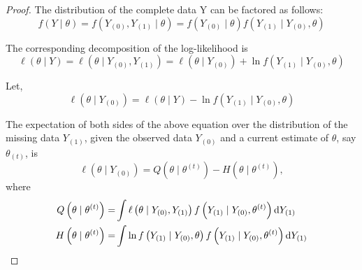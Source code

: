\begin{proof}
	The distribution of the complete data Y can be factored as follows:
	\begin{equation}
		f(Y \mid \theta)=f\left(Y_{(0)}, Y_{(1)} \mid \theta\right)=f\left(Y_{(0)} \mid \theta\right) f\left(Y_{(1)} \mid Y_{(0)}, \theta\right)
	\end{equation}

	The corresponding decomposition of the log-likelihood is
	\begin{equation}
		\ell(\theta \mid Y)=\ell\left(\theta \mid Y_{(0)}, Y_{(1)}\right)=\ell\left(\theta \mid Y_{(0)}\right)+\ln f\left(Y_{(1)} \mid Y_{(0)}, \theta\right)
	\end{equation}

	Let,
	\begin{equation}
		\ell\left(\theta \mid Y_{(0)}\right)=\ell(\theta \mid Y)-\ln f\left(Y_{(1)} \mid Y_{(0)}, \theta\right)
	\end{equation}

	The expectation of both sides of the above equation over the distribution of the missing data $Y_{(1)}$, given the observed data $Y_{(0)}$ and a current estimate of $\theta$, say $\theta_{(t)}$, is
	\begin{equation}
		\ell\left(\theta \mid Y_{(0)}\right)=Q\left(\theta \mid \theta^{(t)}\right)-H\left(\theta \mid \theta^{(t)}\right),
	\end{equation}
	where
	\begin{equation}
		\begin{aligned}
			Q\left(\theta \mid \theta^{(t)}\right)= & \int\ell\left(\theta \mid Y_{(0)}, Y_{(1)}\right) f\left(Y_{(1)} \mid Y_{(0)}, \theta^{(t)}\right) \mathop{}\!\mathrm{d} Y_{(1)} \\
			H\left(\theta\mid\theta^{(t)}\right)=   & \int\ln f\left(Y_{(1)}\mid Y_{(0)},\theta\right)f\left(Y_{(1)} \mid Y_{(0)}, \theta^{(t)}\right) \mathop{}\!\mathrm{d} Y_{(1)}
		\end{aligned}
	\end{equation}


\end{proof}

